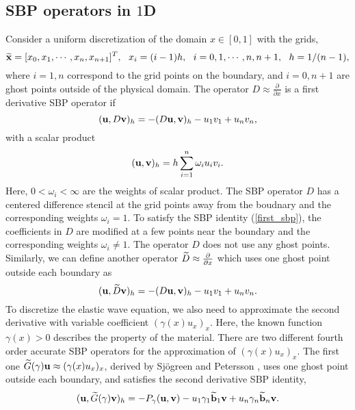 \subsection{SBP operators in $1$D}\label{sec_sbp_1d}
Consider a uniform discretization of the domain $x\in[0,1]$ with the grids,
\[\widetilde
	{\bf x} = [x_0,x_1,\cdots,x_n,x_{n+1}]^T,\ \  x_i = (i-1)h,\ \ i = 0,1,\cdots,n,n+1,\ \ h = 1/(n-1),\]
where $i = 1,n$ correspond to the grid points on the boundary, and $i = 0,n+1$ are ghost points outside of the physical domain. The  operator $D \approx \frac{\partial }{\partial x}$ is a first derivative SBP operator if 
\begin{equation}\label{first_sbp}
({\bf u}, D{\bf v})_h = -(D{\bf u},{\bf v})_h - u_1v_1 + u_nv_n,
\end{equation}
with a scalar product
\begin{equation}\label{inner_product}
({\bf u},{\bf v})_h = h\sum_{i = 1}^{n}\omega_iu_iv_i.
\end{equation}
Here, $0<\omega_i < \infty $ are the weights of scalar product. The SBP operator $D$ has a centered difference stencil at the grid points away from the boudnary and the corresponding weights $\omega_i = 1$. To satisfy the SBP identity (\ref{first_sbp}), the coefficients in $D$ are  modified at a few points near the boundary and the corresponding weights $\omega_i \neq 1$. The operator $D$ does not use any ghost points.  {\color{red}Similarly, we can define another operator $\widetilde{D} \approx\frac{\partial }{\partial x}$ which uses one ghost point outside each boundary as
\begin{equation}\label{first_sbp_gh}
({\bf u}, \wt{D}{\bf v})_h = -(D{\bf u},{\bf v})_h - u_1v_1 + u_nv_n.
\end{equation} }
To discretize the elastic wave equation, we also need to approximate the second derivative with variable coefficient $(\gamma(x)u_x)_x$. Here, the known function $\gamma(x)>0$ describes the property of the material. There are two different fourth order accurate SBP operators for the approximation of $(\gamma(x)u_x)_x$. The first one $\widetilde{G}(\gamma){\bf u} \approx (\gamma(x)u_x)_x $, derived by Sj\"ogreen and Petersson \cite{sjogreen2012fourth}, uses one ghost point outside each boundary, and satisfies the second derivative SBP identity,
\begin{equation}\label{sbp_2nd_1}
({\bf u}, \wt{G}(\gamma){\bf v})_h = -P_\gamma({\bf u},{\bf v})-u_1\gamma_1\wt{\bf b}_1{\bf v} + u_n\gamma_n\wt{\bf b}_n {\bf v}.
\end{equation}
